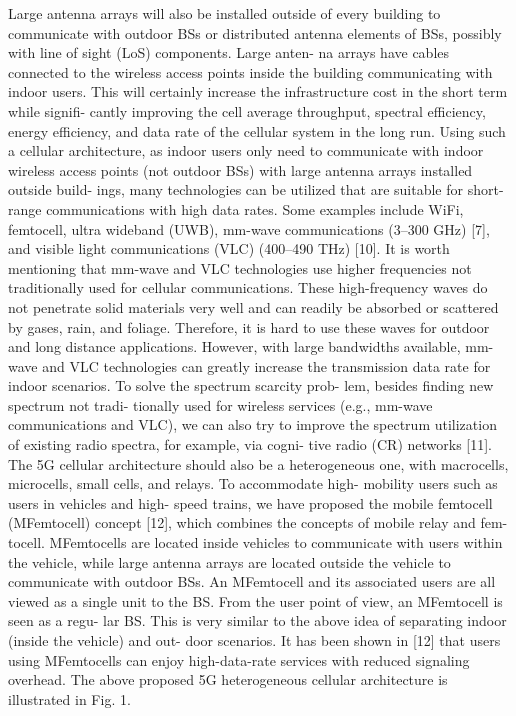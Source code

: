   

 
  
  Large antenna arrays will also be installed outside of every building to communicate with outdoor BSs or distributed antenna elements of BSs, possibly with line of sight (LoS) components. Large anten- na arrays have cables connected to the wireless access points inside the building communicating with indoor users. This will certainly increase the infrastructure cost in the short term while signifi- cantly improving the cell average throughput, spectral efficiency, energy efficiency, and data rate of the cellular system in the long run. Using such a cellular architecture, as indoor users only need to communicate with indoor wireless access points (not outdoor BSs) with large antenna arrays installed outside build- ings, many technologies can be utilized that are suitable for short-range communications with high data rates. Some examples include WiFi, femtocell, ultra wideband (UWB), mm-wave communications (3–300 GHz) [7], and visible light communications (VLC) (400–490 THz) [10]. It is worth mentioning that mm-wave and VLC technologies use higher frequencies not traditionally used for cellular communications. These high-frequency waves do not penetrate solid materials very well and can readily be absorbed or scattered by gases, rain, and foliage. Therefore, it is hard to use these waves for outdoor and long distance applications. However, with large bandwidths available, mm- wave and VLC technologies can greatly increase the transmission data rate for indoor scenarios. To solve the spectrum scarcity prob- lem, besides finding new spectrum not tradi- tionally used for wireless services (e.g., mm-wave communications and VLC), we can also try to improve the spectrum utilization of existing radio spectra, for example, via cogni- tive radio (CR) networks [11].
The 5G cellular architecture should also be a heterogeneous one, with macrocells, microcells, small cells, and relays. To accommodate high- mobility users such as users in vehicles and high- speed trains, we have proposed the mobile femtocell (MFemtocell) concept [12], which combines the concepts of mobile relay and fem- tocell. MFemtocells are located inside vehicles to communicate with users within the vehicle, while large antenna arrays are located outside the vehicle to communicate with outdoor BSs. An MFemtocell and its associated users are all viewed as a single unit to the BS. From the user point of view, an MFemtocell is seen as a regu- lar BS. This is very similar to the above idea of separating indoor (inside the vehicle) and out- door scenarios. It has been shown in [12] that users using MFemtocells can enjoy high-data-rate services with reduced signaling overhead. The above proposed 5G heterogeneous cellular architecture is illustrated in Fig. 1.







